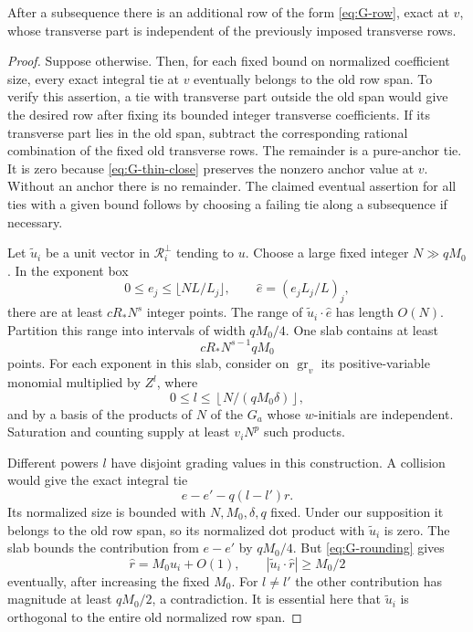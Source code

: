 \begin{claim}\label{clm:G-new-row}
After a subsequence there is an additional row of the form
\eqref{eq:G-row}, exact at $v$, whose transverse part is independent of
the previously imposed transverse rows.
\end{claim}
\begin{proof}
Suppose otherwise.  Then, for each fixed bound on normalized coefficient
size, every exact integral tie at $v$ eventually belongs to the old row
span.  To verify this assertion, a tie with transverse part outside the
old span would give the desired row after fixing its bounded integer
transverse coefficients.  If its transverse part lies in the old span,
subtract the corresponding rational combination of the fixed old
transverse rows.  The remainder is a pure-anchor tie.  It is zero
because \eqref{eq:G-thin-close} preserves the nonzero anchor value at
$v$.  Without an anchor there is no remainder.  The claimed eventual
assertion for all ties with a given bound follows by choosing a failing
tie along a subsequence if necessary.

Let $\widetilde u_i$ be a unit vector in $\mathcal R_i^\perp$ tending to
$u$.  Choose a large fixed integer $N\gg qM_0$.  In the exponent box
\[
           0\le e_j\le\lfloor NL/L_j\rfloor,
           \qquad \widehat e=(e_jL_j/L)_j,
\]
there are at least $cR_*N^s$ integer points.  The range of
$\widetilde u_i\cdot\widehat e$ has length $O(N)$.  Partition this range
into intervals of width $qM_0/4$.  One slab contains at least
\begin{equation}\label{eq:G-slab-size}
                           cR_*N^{s-1}qM_0
\end{equation}
points.  For each exponent in this slab, consider on
$\operatorname{gr}_v$ its positive-variable monomial multiplied by $Z^l$,
where
\begin{equation}\label{eq:G-powers}
                     0\le l\le\left\lfloor
                                     N/(qM_0\delta)\right\rfloor,
\end{equation}
and by a basis of the products of $N$ of the $G_a$ whose $w$-initials
are independent.  Saturation and counting supply at least $v_iN^p$
such products.

Different powers $l$ have disjoint grading values in this construction.
A collision would give the exact integral tie
\[
                              e-e'-q(l-l')r.
\]
Its normalized size is bounded with $N,M_0,\delta,q$ fixed.  Under our
supposition it belongs to the old row span, so its normalized dot
product with $\widetilde u_i$ is zero.  The slab bounds the contribution
from $e-e'$ by $qM_0/4$.  But \eqref{eq:G-rounding} gives
\[
       \widehat r=M_0u_i+O(1),
       \qquad |\widetilde u_i\cdot\widehat r|\ge M_0/2
\]
eventually, after increasing the fixed $M_0$.  For $l\ne l'$ the other
contribution has magnitude at least $qM_0/2$, a contradiction.  It is
essential here that $\widetilde u_i$ is orthogonal to the entire old
normalized row span.


\end{proof}
